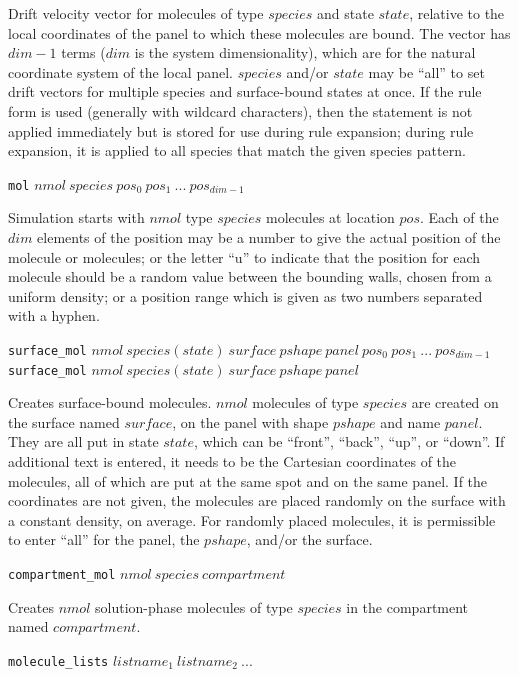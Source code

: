 \documentclass {book}
\newcommand {\ttt} {\texttt}
\begin{document}
\begin{description}
Drift velocity vector for molecules of type $species$ and state $state$, relative to the local coordinates of the panel to which these molecules are bound. The vector has $dim-1$ terms ($dim$ is the system dimensionality), which are for the natural coordinate system of the local panel. $species$ and/or $state$ may be ``all'' to set drift vectors for multiple species and surface-bound states at once. If the rule form is used (generally with wildcard characters), then the statement is not applied immediately but is stored for use during rule expansion; during rule expansion, it is applied to all species that match the given species pattern.

\item{\ttt{mol} $nmol\ species\ pos_0\ pos_1\ ...\ pos_{dim-1}$}

Simulation starts with $nmol$ type $species$ molecules at location $pos$. Each of the $dim$ elements of the position may be a number to give the actual position of the molecule or molecules; or the letter ``u'' to indicate that the position for each molecule should be a random value between the bounding walls, chosen from a uniform density; or a position range which is given as two numbers separated with a hyphen.

\item{\ttt{surface\_mol} $nmol\ species(state)\ surface\ pshape\ panel\ pos_0\ pos_1\ ...\ pos_{dim-1}$\\
\ttt{surface\_mol} $nmol\ species(state)\ surface\ pshape\ panel$}

Creates surface-bound molecules. $nmol$ molecules of type $species$ are created on the surface named $surface$, on the panel with shape $pshape$ and name $panel$. They are all put in state $state$, which can be ``front'', ``back'', ``up'', or ``down''. If additional text is entered, it needs to be the Cartesian coordinates of the molecules, all of which are put at the same spot and on the same panel. If the coordinates are not given, the molecules are placed randomly on the surface with a constant density, on average. For randomly placed molecules, it is permissible to enter ``all'' for the panel, the $pshape$, and/or the surface.

\item{\ttt{compartment\_mol} $nmol\ species\ compartment$}

Creates $nmol$ solution-phase molecules of type $species$ in the compartment named $compartment$.

\item{\ttt{molecule\_lists} $listname_1\ listname_2\ ...$}


\end{description}
\end{document}

